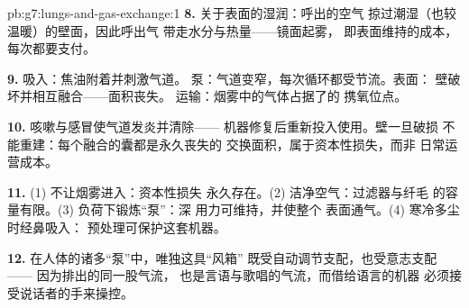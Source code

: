 \begin{solution}{pb:g7:lungs-and-gas-exchange:1}
\textbf{8.} 关于表面的湿润：呼出的空气
掠过潮湿（也较温暖）的壁面，因此呼出气
带走水分与热量——镜面起雾，
即表面维持的成本，每次都要支付。

\textbf{9.} 吸入：焦油附着并刺激气道。
泵：气道变窄，每次循环都受节流。表面：
壁破坏并相互融合——面积丧失。
运输：烟雾中的气体占据了的
携氧位点。

\textbf{10.} 咳嗽与感冒使气道发炎并清除——
机器修复后重新投入使用。壁一旦破损
不能重建：每个融合的囊都是永久丧失的
交换面积，属于资本性损失，而非
日常运营成本。

\textbf{11.} (1) 不让烟雾进入：资本性损失
永久存在。(2) 洁净空气：过滤器与纤毛
的容量有限。(3) 负荷下锻炼“泵”：深
用力可维持，并使整个
表面通气。(4) 寒冷多尘时经鼻吸入：
预处理可保护这套机器。

\textbf{12.} 在人体的诸多“泵”中，唯独这具“风箱”
既受自动调节支配，也受意志支配——
因为排出的同一股气流，
也是言语与歌唱的气流，而借给语言的机器
必须接受说话者的手来操控。
\end{solution}

